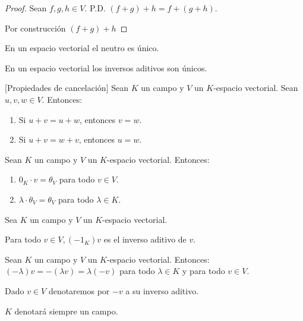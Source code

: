 \begin{proof}
    Sean $f,g,h \in V$. 
    P.D. $(f+g)+h = f+(g+h)$.

    Por construcción $(f+g)+h$ 
\end{proof}





\begin{proposition}{}{}
    En un espacio vectorial el neutro es único.
\end{proposition}
\begin{proposition}{}{}
    En un espacio vectorial los inversos aditivos son únicos.
\end{proposition}
\begin{proposition}{}{}[Propiedades de cancelación]
    Sean $K$ un campo y $V$ un $K$-espacio vectorial. Sean $u,v,w\in V$. Entonces:
    \begin{enumerate}
        \item Si $u+v=u+w$, entonces $v=w$.
        \item Si $u+v=w+v$, entonces $u=w$.
    \end{enumerate}
\end{proposition}
\begin{proposition}{}{}
    Sean $K$ un campo y $V$ un $K$-espacio vectorial. Entonces:
    \begin{enumerate}
        \item $0_K \cdot v = \theta_V$ para todo $v\in V$.
        \item $\lambda \cdot \theta_V = \theta_V$ para todo $\lambda \in K$.
    \end{enumerate}
\end{proposition}
\begin{proposition}{}{}
    Sea $K$ un campo y $V$ un $K$-espacio vectorial. 
    
    Para todo $v\in V, (-1_K)v$ es el inverso aditivo de $v$.
\end{proposition}
\begin{corollary}{}{}
    Sean $K$ un campo y $V$ un $K$-espacio vectorial. Entonces:
    $(-\lambda)v = - (\lambda v) = \lambda (-v)$ para todo $\lambda \in K$ y para todo $v\in V$.
\end{corollary}


\begin{notation}{}{}
    Dado $v \in V$ denotaremos por $-v$ a su inverso aditivo.
\end{notation}
\begin{notation}{}{}
    $K$ denotará siempre un campo.
\end{notation}

